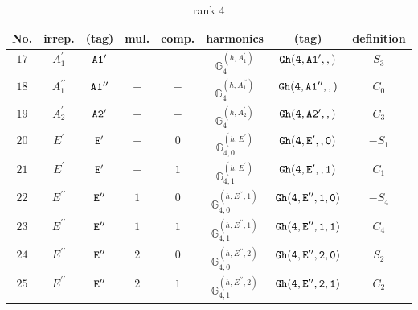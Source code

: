 \documentclass[fleqn,8pt]{jsarticle}
\begin{document}
\begin{table}[ht!]
\begin{center}
\caption{rank 4}
\renewcommand{\arraystretch}{1.3}
\begin{tabular}{cccccccc} \hline \hline
No. & irrep. & (tag) & mul. & comp. & harmonics & (tag) & definition \\ \hline
$ 17 $ & $ A_{1}^{\prime} $ & $ {\tt A1'} $ & $ - $ & $ - $ & $ \mathbb{G}_{4}^{(h,A_{1}^{\prime})} $ & $ {\tt Gh(4,A1',,)} $ & $ S_{3} $ \\
$ 18 $ & $ A_{1}^{\prime\prime} $ & $ {\tt A1''} $ & $ - $ & $ - $ & $ \mathbb{G}_{4}^{(h,A_{1}^{\prime\prime})} $ & $ {\tt Gh(4,A1'',,)} $ & $ C_{0} $ \\
$ 19 $ & $ A_{2}^{\prime} $ & $ {\tt A2'} $ & $ - $ & $ - $ & $ \mathbb{G}_{4}^{(h,A_{2}^{\prime})} $ & $ {\tt Gh(4,A2',,)} $ & $ C_{3} $ \\
$ 20 $ & $ E^{\prime} $ & $ {\tt E'} $ & $ - $ & $ 0 $ & $ \mathbb{G}_{4,0}^{(h,E^{\prime})} $ & $ {\tt Gh(4,E',,0)} $ & $ - S_{1} $ \\
$ 21 $ & $ E^{\prime} $ & $ {\tt E'} $ & $ - $ & $ 1 $ & $ \mathbb{G}_{4,1}^{(h,E^{\prime})} $ & $ {\tt Gh(4,E',,1)} $ & $ C_{1} $ \\
$ 22 $ & $ E^{\prime\prime} $ & $ {\tt E''} $ & $ 1 $ & $ 0 $ & $ \mathbb{G}_{4,0}^{(h,E^{\prime\prime},1)} $ & $ {\tt Gh(4,E'',1,0)} $ & $ - S_{4} $ \\
$ 23 $ & $ E^{\prime\prime} $ & $ {\tt E''} $ & $ 1 $ & $ 1 $ & $ \mathbb{G}_{4,1}^{(h,E^{\prime\prime},1)} $ & $ {\tt Gh(4,E'',1,1)} $ & $ C_{4} $ \\
$ 24 $ & $ E^{\prime\prime} $ & $ {\tt E''} $ & $ 2 $ & $ 0 $ & $ \mathbb{G}_{4,0}^{(h,E^{\prime\prime},2)} $ & $ {\tt Gh(4,E'',2,0)} $ & $ S_{2} $ \\
$ 25 $ & $ E^{\prime\prime} $ & $ {\tt E''} $ & $ 2 $ & $ 1 $ & $ \mathbb{G}_{4,1}^{(h,E^{\prime\prime},2)} $ & $ {\tt Gh(4,E'',2,1)} $ & $ C_{2} $ \\
 \hline \hline
\end{tabular}
\end{center}
\end{table}
\end{document}
